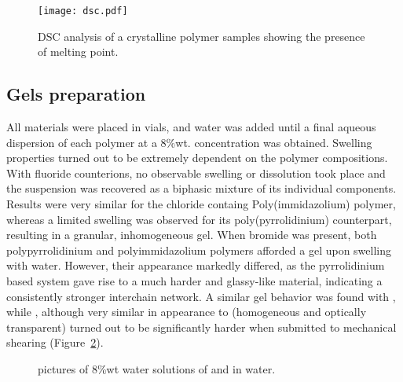 \documentclass[journal=jacsat,manuscript=article]{achemso}
\begin{document}
\begin{figure}
\texttt{[image: dsc.pdf]}
\caption{DSC analysis of a crystalline polymer samples showing the presence of melting point.}
\label{fig:dsc}
\end{figure}

\subsection{Gels preparation}
All materials were placed in vials, and water was added until a final aqueous dispersion of each polymer at a 8\%wt. concentration was obtained. Swelling properties turned out to be extremely dependent on the polymer compositions. With fluoride counterions, no observable swelling or dissolution took place and the suspension was recovered as a biphasic mixture of its individual components. Results were very similar for the chloride containg Poly(immidazolium) polymer, whereas a limited swelling was observed for its poly(pyrrolidinium) counterpart, resulting in a granular, inhomogeneous gel. When bromide was present, both polypyrrolidinium and polyimmidazolium polymers afforded a gel upon swelling with water. However, their appearance markedly differed, as the pyrrolidinium based system gave rise to a much harder and glassy-like material, indicating a consistently stronger interchain network. A similar gel behavior was found with , while , although very similar in appearance to  (homogeneous and optically transparent) turned out to be significantly harder when submitted to mechanical shearing (Figure~\ref{fig:pictures}).

\begin{figure}
\caption{pictures of 8\%wt water solutions of  and  in water.}
\label{fig:pictures}
\end{figure}
\end{document}
